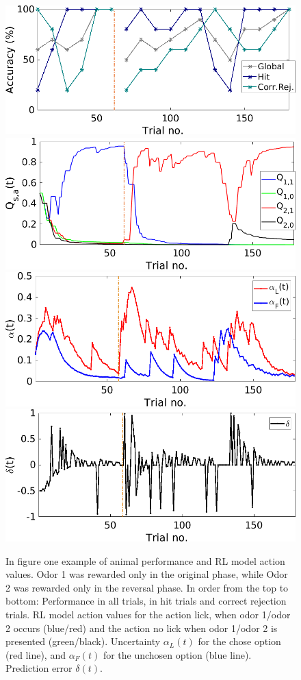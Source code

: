 \begin{figure}
    \centering
    \includegraphics[scale=0.4]{figures/PerfEndrevAn1.png}
    \includegraphics[scale=0.4]{figures/QValuesEndrevAn1.png}
    \includegraphics[scale=0.4]{figures/AlphaEndrevAn1.png}
    \includegraphics[scale=0.4]{figures/DeltaEndrevAn1.png}
    \caption{In figure one example of animal performance and RL model action
values. Odor 1 was rewarded only in the original phase, while Odor 2 was rewarded
only in the reversal phase. In order from the top to bottom: Performance in all trials, in hit trials and correct rejection trials. RL model action values for the action lick, when odor 1/odor 2 occurs (blue/red) and the action no lick when odor 1/odor 2 is presented
(green/black). Uncertainty $\alpha_L(t)$ for the chose option (red line), and $\alpha_F(t)$ for the unchosen option (blue line). Prediction error $\delta(t)$.}
    \label{fig:L-Fmodel}
\end{figure}
